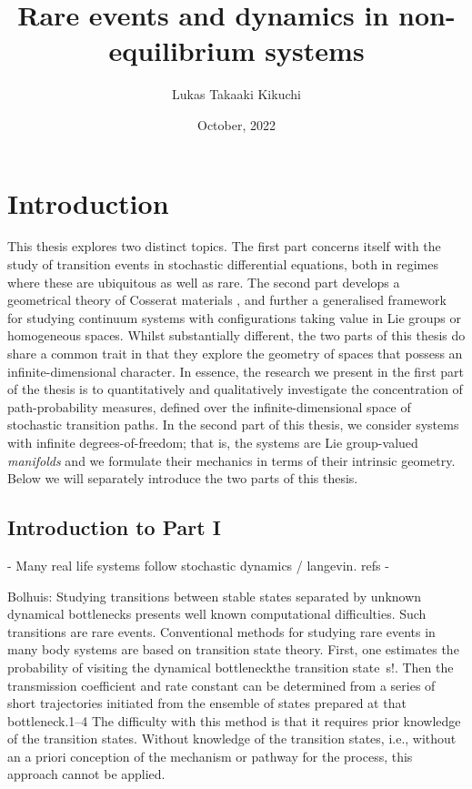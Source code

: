 \documentclass[]{cam-thesis}
\title{Rare events and dynamics in non-equilibrium systems}
\author{Lukas Takaaki Kikuchi}
\date{October, 2022}
\begin{document}
\frontmatter{}









\chapter*{Introduction}

This thesis explores two distinct topics. The first part concerns itself with the study of transition events in stochastic differential equations, both in regimes where these are ubiquitous as well as rare. The second part develops a geometrical theory of Cosserat materials \citep{cosseratTheoryDeformableBodies1909}, and further a generalised framework for studying continuum systems with configurations taking value in Lie groups or homogeneous spaces. Whilst substantially different, the two parts of this thesis do share a common trait in that they explore the geometry of spaces that possess an infinite-dimensional character. In essence, the research we present in the first part of the thesis is to quantitatively and qualitatively investigate the concentration of path-probability measures, defined over the infinite-dimensional space of stochastic transition paths. In the second part of this thesis, we consider systems with infinite degrees-of-freedom; that is, the systems are Lie group-valued \textit{manifolds} and we formulate their mechanics in terms of their intrinsic geometry. Below we will separately introduce the two parts of this thesis.

\section*{Introduction to Part I}

- Many real life systems follow stochastic dynamics / langevin. refs
- 

Bolhuis:
Studying transitions between stable states separated by unknown dynamical bottlenecks presents well known computational difficulties. Such transitions are rare events. Conventional methods for studying rare events in many body systems are based on transition state theory. First, one estimates the probability of visiting the dynamical bottleneckthe transition state~s!. Then the transmission coefficient and rate constant can be determined from a series of short trajectories initiated from the ensemble of states prepared at that bottleneck.1–4 The difficulty with this method is that it requires prior knowledge of the transition states. Without knowledge of the transition states, i.e., without an a priori conception of the mechanism or pathway for the process, this approach cannot be applied.
\end{document}
